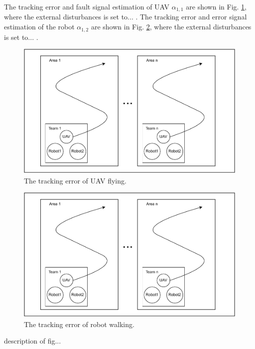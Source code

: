 \documentclass{ieeeaccess}
\begin{document}
The tracking error and fault signal estimation of UAV $\alpha_{1,1}$ are shown in Fig. \ref{fig:UAV, error, estimation}, where the external disturbances is set to... . The tracking error and error signal estimation of the robot $\alpha_{1,2}$ are shown in Fig. \ref{fig:robot, error, estimation}, where the external disturbances is set to... .
\begin{figure}[htbp]
    \centering
    \includegraphics[scale=.42]{fig/1.pdf}\caption{The tracking error of UAV flying.}%
    \label{fig:UAV, error, estimation}
\end{figure}
\begin{figure}[htbp]
    \centering
    \includegraphics[scale=.42]{fig/1.pdf}\caption{The tracking error of robot walking.}%
    \label{fig:robot, error, estimation}
\end{figure}

description of fig...
\end{document}
